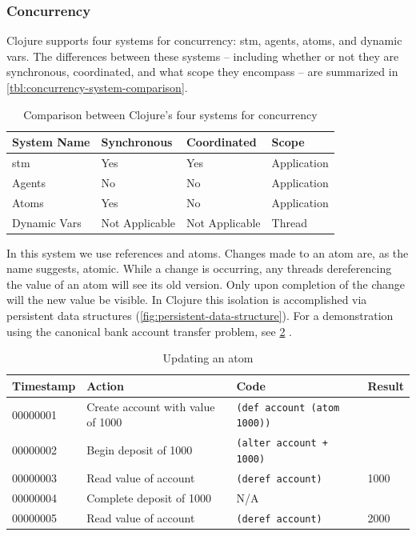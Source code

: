 		\subsubsection{Concurrency}
			Clojure supports four systems for concurrency:  \gls{stm}, agents, atoms, and dynamic vars.  The differences between these systems -- including whether or not they are synchronous, coordinated, and what scope they encompass -- are summarized in \vref{tbl:concurrency-system-comparison}.
			
			\begin{table}[H]
				\centering
				
				\begin{tabular}{llll}
					\toprule
					System Name & Synchronous & Coordinated & Scope \\
					\midrule
					\gls{stm} & Yes & Yes & Application \\
					Agents & No & No & Application \\
					Atoms & Yes & No & Application \\
					Dynamic Vars & Not Applicable & Not Applicable & Thread \\
					\bottomrule
				\end{tabular}
				
				\caption{Comparison between Clojure's four systems for concurrency}
				\label{tbl:concurrency-system-comparison}
			\end{table}
			
			In this system we use references and atoms.  Changes made to an atom are, as the name suggests, atomic.  While a change is occurring, any threads dereferencing the value of an atom will see its old version.  Only upon completion of the change will the new value be visible.  In Clojure this isolation is accomplished via persistent data structures (\cref{fig:persistent-data-structure}).  For a demonstration using the canonical bank account transfer problem, see \cref{tbl:updating-an-atom} \cite{bank-problem}.
			
			\begin{table}[H]
				\centering
				
				\begin{tabular}{llll}
					\toprule
					Timestamp & Action & Code & Result \\
					\midrule
					00000001 & Create account with value of 1000 & \texttt{(def account (atom 1000))} &  \\
					00000002 & Begin deposit of 1000 & \texttt{(alter account + 1000)} &  \\
					00000003 & Read value of account & \texttt{(deref account)} & 1000 \\
					00000004 & Complete deposit of 1000 & N/A &  \\
					00000005 & Read value of account & \texttt{(deref account)} & 2000 \\
					\bottomrule
				\end{tabular}
				
				\caption{Updating an atom}
				\label{tbl:updating-an-atom}
			\end{table}
			
